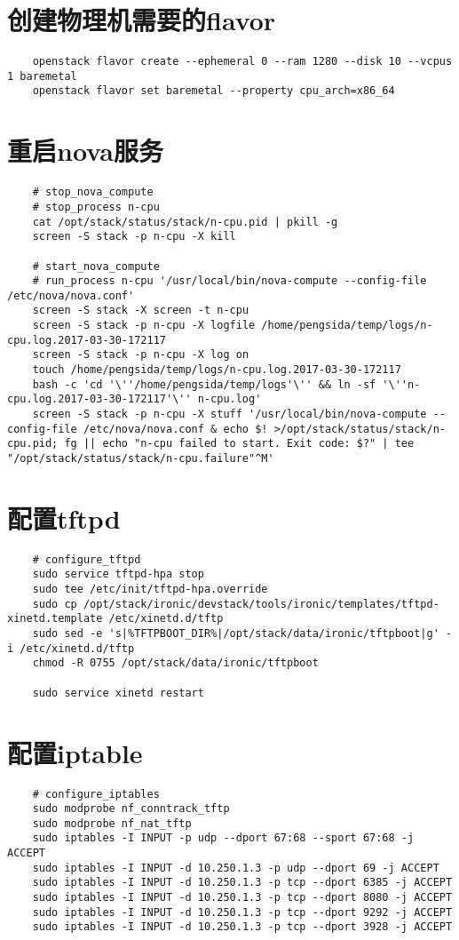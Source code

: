 \documentclass[a4paper,left=1.5cm,right=1.5cm,11pt]{article}
\begin{document}
\section{创建物理机需要的flavor}
	\begin{lstlisting}
	openstack flavor create --ephemeral 0 --ram 1280 --disk 10 --vcpus 1 baremetal
	openstack flavor set baremetal --property cpu_arch=x86_64	
	\end{lstlisting}

\section{重启nova服务}
	\begin{lstlisting}
	# stop_nova_compute
	# stop_process n-cpu
	cat /opt/stack/status/stack/n-cpu.pid | pkill -g
	screen -S stack -p n-cpu -X kill
	
	# start_nova_compute
	# run_process n-cpu '/usr/local/bin/nova-compute --config-file /etc/nova/nova.conf'
	screen -S stack -X screen -t n-cpu
	screen -S stack -p n-cpu -X logfile /home/pengsida/temp/logs/n-cpu.log.2017-03-30-172117
	screen -S stack -p n-cpu -X log on
	touch /home/pengsida/temp/logs/n-cpu.log.2017-03-30-172117
	bash -c 'cd '\''/home/pengsida/temp/logs'\'' && ln -sf '\''n-cpu.log.2017-03-30-172117'\'' n-cpu.log'
	screen -S stack -p n-cpu -X stuff '/usr/local/bin/nova-compute --config-file /etc/nova/nova.conf & echo $! >/opt/stack/status/stack/n-cpu.pid; fg || echo "n-cpu failed to start. Exit code: $?" | tee "/opt/stack/status/stack/n-cpu.failure"^M'	
	\end{lstlisting}

\section{配置tftpd}
	\begin{lstlisting}
	# configure_tftpd
	sudo service tftpd-hpa stop
	sudo tee /etc/init/tftpd-hpa.override
	sudo cp /opt/stack/ironic/devstack/tools/ironic/templates/tftpd-xinetd.template /etc/xinetd.d/tftp
	sudo sed -e 's|%TFTPBOOT_DIR%|/opt/stack/data/ironic/tftpboot|g' -i /etc/xinetd.d/tftp
	chmod -R 0755 /opt/stack/data/ironic/tftpboot
	
	sudo service xinetd restart
	\end{lstlisting}

\section{配置iptable}
	\begin{lstlisting}
	# configure_iptables
	sudo modprobe nf_conntrack_tftp
	sudo modprobe nf_nat_tftp
	sudo iptables -I INPUT -p udp --dport 67:68 --sport 67:68 -j ACCEPT
	sudo iptables -I INPUT -d 10.250.1.3 -p udp --dport 69 -j ACCEPT
	sudo iptables -I INPUT -d 10.250.1.3 -p tcp --dport 6385 -j ACCEPT
	sudo iptables -I INPUT -d 10.250.1.3 -p tcp --dport 8080 -j ACCEPT
	sudo iptables -I INPUT -d 10.250.1.3 -p tcp --dport 9292 -j ACCEPT
	sudo iptables -I INPUT -d 10.250.1.3 -p tcp --dport 3928 -j ACCEPT
	\end{lstlisting}
	
\end{document}
